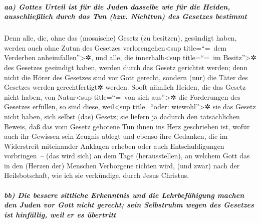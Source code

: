 \hypertarget{aa-gottes-urteil-ist-fuxfcr-die-juden-dasselbe-wie-fuxfcr-die-heiden-ausschlieuxdflich-durch-das-tun-bzw.-nichttun-des-gesetzes-bestimmt}{%
\subparagraph{aa) Gottes Urteil ist für die Juden dasselbe wie für die
Heiden, ausschließlich durch das Tun (bzw. Nichttun) des Gesetzes
bestimmt}\label{aa-gottes-urteil-ist-fuxfcr-die-juden-dasselbe-wie-fuxfcr-die-heiden-ausschlieuxdflich-durch-das-tun-bzw.-nichttun-des-gesetzes-bestimmt}}

 Denn alle, die, ohne das (mosaische) Gesetz (zu
besitzen), gesündigt haben, werden auch ohne Zutun des Gesetzes
verlorengehen\textless sup title=``=~dem Verderben
anheimfallen''\textgreater✲, und alle, die innerhalb\textless sup
title=``=~im Besitz''\textgreater✲ des Gesetzes gesündigt haben, werden
durch das Gesetz gerichtet werden;  denn nicht die Hörer
des Gesetzes sind vor Gott gerecht, sondern (nur) die Täter des Gesetzes
werden gerechtfertigt✲ werden.  Sooft nämlich Heiden, die
das Gesetz nicht haben, von Natur\textless sup title=``=~von sich
aus''\textgreater✲ die Forderungen des Gesetzes erfüllen, so sind diese,
weil\textless sup title=``oder: wiewohl''\textgreater✲ sie das Gesetz
nicht haben, sich selbst (das) Gesetz;  sie liefern ja
dadurch den tatsächlichen Beweis, daß das vom Gesetz gebotene Tun ihnen
ins Herz geschrieben ist, wofür auch ihr Gewissen sein Zeugnis ablegt
und ebenso ihre Gedanken, die im Widerstreit miteinander Anklagen
erheben oder auch Entschuldigungen vorbringen~--  (das
wird sich) an dem Tage (herausstellen), an welchem Gott das in den
(Herzen der) Menschen Verborgene richten wird, (und zwar) nach der
Heilsbotschaft, wie ich sie verkündige, durch Jesus Christus.

\hypertarget{bb-die-bessere-sittliche-erkenntnis-und-die-lehrbefuxe4higung-machen-den-juden-vor-gott-nicht-gerecht-sein-selbstruhm-wegen-des-gesetzes-ist-hinfuxe4llig-weil-er-es-uxfcbertritt}{%
\subparagraph{bb) Die bessere sittliche Erkenntnis und die
Lehrbefähigung machen den Juden vor Gott nicht gerecht; sein Selbstruhm
wegen des Gesetzes ist hinfällig, weil er es
übertritt}\label{bb-die-bessere-sittliche-erkenntnis-und-die-lehrbefuxe4higung-machen-den-juden-vor-gott-nicht-gerecht-sein-selbstruhm-wegen-des-gesetzes-ist-hinfuxe4llig-weil-er-es-uxfcbertritt}}

